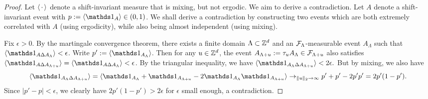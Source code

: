 \begin{proof}
    Let $\langle\,\cdot\,\rangle$ denote a shift-invariant measure that is mixing, but not ergodic.
    We aim to derive a contradiction.
    Let $A$ denote a shift-invariant event with $p:=\langle\ind{A}\rangle\in(0,1)$.
    We shall derive a contradiction by constructing two events which
    are both extremely correlated with $A$ (using ergodicity),
    while also being almost independent (using mixing).

    Fix $\epsilon>0$.
    By the martingale convergence theorem,
    there exists a finite domain $\Lambda\subset\mathbb Z^d$
    and an $\mathcal F_\Lambda$-measurable event
    $A_\Lambda$
    such that
    $\langle \ind{A\Delta A_\Lambda}\rangle<\epsilon$.
    Write $p':=\langle \ind{A_\Lambda}\rangle$.
    Then for any $u\in\mathbb Z^d$,
    the event $A_{\Lambda+u}:=\tau_uA_\Lambda\in\mathcal F_{\Lambda+u}$
    also satisfies
    $\langle \ind{A\Delta A_{\Lambda+u}}\rangle=\langle \ind{A\Delta A_\Lambda}\rangle<\epsilon$.
    By the triangular inequality, we have
    \(
        \langle \ind{A_\Lambda\Delta A_{\Lambda+u}}\rangle
        <2\epsilon.
    \)
    But by mixing, we also have
    \[
        \langle \ind{A_\Lambda\Delta A_{\Lambda+u}}\rangle
        =
        \langle \ind{A_\Lambda}+\ind{A_{\Lambda+u}}
        -
        2 \ind{A_\Lambda}\ind{A_{\Lambda+u}}\rangle
        \to_{\|u\|_2\to\infty}
        p'+p'-2p'p'
        =2p'(1-p').
    \]
    Since $|p'-p|<\epsilon$,
    we clearly have $2p'(1-p')>2\epsilon$ for $\epsilon$ small enough,
    a contradiction.
\end{proof}



